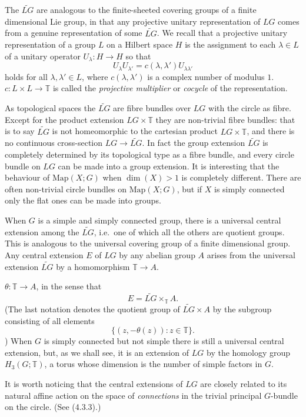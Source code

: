 \documentclass[12pt]{article}
\begin{document}
The $\widetilde{LG}$ are
analogous to the finite-sheeted covering groups of a finite dimensional
Lie group, in that any projective unitary representation of $LG$ comes
from a genuine representation of some $\widetilde{LG}$. We recall that a
projective unitary representation of a group $L$ on a Hilbert space $H$
is the assignment to each $\lambda \in L$ of a unitary operator
$U_\lambda : H \to H$ so that
\[
    U_\lambda U_{\lambda'} = c(\lambda, \lambda') U_{\lambda\lambda'}
\]
holds for all $\lambda, \lambda' \in L$, where $c(\lambda,\lambda')$ is a
complex number of modulus $1$. $c : L \times L \to \mathbb{T}$ is called the \emph{projective multiplier} or \emph{cocycle} of the representation.

As topological spaces the $\widetilde{LG}$ are fibre bundles over $LG$ with the circle as fibre. Except for the product extension $LG \times \mathbb{T}$ they are non-trivial fibre bundles: that is to say
$\widetilde{LG}$ is not homeomorphic to the cartesian product
$LG \times \mathbb{T}$, and there is no continuous cross-section
$LG \to \widetilde{LG}$. In fact the group extension $\widetilde{LG}$ is
completely determined by its topological type as a fibre bundle, and
every circle bundle on $LG$ can be made into a group extension. It is
interesting that the behaviour of $\mathrm{Map}(X;G)$ when
$\dim(X) > 1$ is completely different. There are often non-trivial circle
bundles on $\mathrm{Map}(X;G)$, but if $X$ is simply connected only the flat ones can be made into groups.

When $G$ is a simple and simply connected group, there is a universal central extension among the $\widetilde{LG}$, i.e.\ one of
which all the others are quotient groups. This is analogous to the
universal covering group of a finite dimensional group. Any central
extension $E$ of $LG$ by any abelian group $A$ arises from the universal
extension $\widetilde{LG}$ by a homomorphism
$\mathbb{T} \to A$.

$\theta : \mathbb{T} \to A$, in the sense that
\[
    E = \widetilde{LG} \times_{\mathbb{T}} A.
\]
(The last notation denotes the quotient group of $\widetilde{LG} \times A$ by the subgroup consisting of all elements
\[
    \{(z, -\theta(z)) : z \in \mathbb{T}\}.
\])
When $G$ is simply connected but not simple there is still a universal central extension, but, as we shall see, it is an extension of $LG$ by the homology group $H_3(G;\mathbb{T})$, a torus whose dimension is the number of simple factors in $G$.

It is worth noticing that the central extensions of $LG$ are closely related to its natural affine action on the space of \emph{connections} in the trivial principal $G$-bundle on the circle. (See (4.3.3).)
\end{document}
